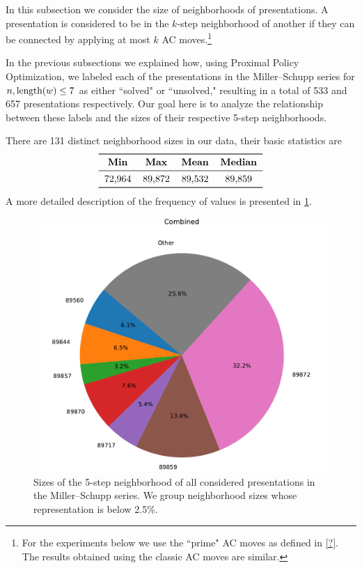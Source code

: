 
In this subsection we consider the size of neighborhoods of presentations.
A presentation is considered to be in the $k$-step neighborhood of another if they can be connected by applying at most $k$ AC moves.\footnote{For the experiments below we use the ``prime" AC moves as defined in \cref{?}. The results obtained using the classic AC moves are similar.}

In the previous subsections we explained how, using Proximal Policy Optimization, we labeled each of the presentations in the Miller–Schupp series for $n, \operatorname{length}(w) \leq 7$ as either ``solved" or ``unsolved," resulting in a total of 533 and 657 presentations respectively.
Our goal here is to analyze the relationship between these labels and the sizes of their respective 5-step neighborhoods.

There are 131 distinct neighborhood sizes in our data, their basic statistics are
\[
\begin{tabular}{cccccc}
	\toprule
	\textbf{Min} & \textbf{Max} & \textbf{Mean} & \textbf{Median} \\
	\midrule
	72,964 & 89,872 & 89,532 & 89,859 \\
	\bottomrule
\end{tabular}
\]
A more detailed description of the frequency of values is presented in \cref{fig:prime_combined_pie}.

\begin{figure}
	\includegraphics[scale=.4]{fig/prime_combined_pie_cropped.pdf}
	\caption{Sizes of the 5-step neighborhood of all considered presentations in the Miller–Schupp series. We group neighborhood sizes whose representation is below 2.5\%.}
	\label{fig:prime_combined_pie}
\end{figure}

